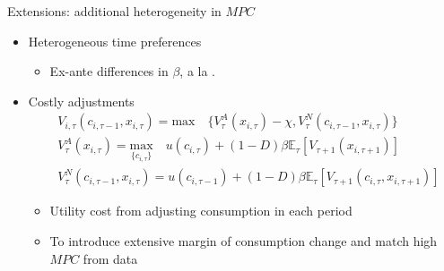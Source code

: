 \documentclass{beamer}
\begin{document}
\begin{frame}{Extensions: additional heterogeneity in $MPC$}
	
	\begin{itemize}
		\item Heterogeneous time preferences
		\begin{itemize}
			\item Ex-ante differences in $\beta$, a la \cite{krusell1998income,carroll2017distribution,krueger2016macroeconomics}.
		\end{itemize}
		\item Costly adjustments
		\begin{equation*}
			\begin{split}
				& V_{i,\tau}(c_{i,\tau-1},x_{i,\tau}) = \textrm{max} \quad \{V^A_{\tau}(x_{i,\tau})-\chi,V^N_{\tau}(c_{i,\tau-1},x_{i,\tau})\} \\
				& V^A_{\tau}(x_{i,\tau}) = \underset{\{c_{i,\tau}\}}{\textrm{max}} \quad u(c_{i,\tau}) + (1-D)\beta \mathbb{E}_{\tau}\left[V_{\tau+1}(x_{i,\tau+1})\right]  \\
				& V^N_{\tau}(c_{i,\tau-1},x_{i,\tau}) =  u(c_{i,\tau-1}) + (1-D)\beta \mathbb{E}_{\tau}\left[V_{\tau+1}(c_{i,\tau},x_{i,\tau+1})\right]
			\end{split}
		\end{equation*}
		\begin{itemize}
			\item Utility cost from adjusting consumption in each period
			\item To introduce extensive margin of consumption change and match high $MPC$ from data 
		\end{itemize}
	\end{itemize}
\end{frame}




\end{document}
